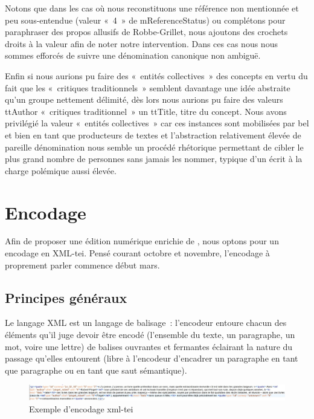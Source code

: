 \documentclass[12pt, a4paper]{article}
\begin{document}
Notons que dans les cas où nous reconstituons une référence non mentionnée et peu sous-entendue (valeur «~4~» de mReferenceStatus) ou complétons pour paraphraser des propos allusifs de Robbe-Grillet, nous ajoutons des crochets droits à la valeur afin de noter notre intervention. Dans ces cas nous nous sommes efforcés de suivre une dénomination canonique non ambiguë.

Enfin si nous aurions pu faire des «~entités collectives~» des concepts en vertu du fait que les «~critiques traditionnels~» semblent davantage une idée abstraite qu'un groupe nettement délimité, dès lors nous aurions pu faire des valeurs ttAuthor «~critiques traditionnel~» un ttTitle, titre du concept. Nous avons privilégié la valeur «~entités collectives~» car ces instances sont mobilisées par \robbe{} bel et bien en tant que producteurs de textes et l'abstraction relativement élevée de pareille dénomination nous semble un procédé rhétorique permettant de cibler le plus grand nombre de personnes sans jamais les nommer, typique d'un écrit à la charge polémique aussi élevée.






\section{Encodage}
Afin de proposer une édition numérique enrichie de \punr, nous optons pour un encodage en XML-tei. Pensé courant octobre et novembre, l'encodage à proprement parler commence début mars.
    \subsection{Principes généraux}
Le langage XML est un langage de balisage~: l'encodeur entoure chacun des éléments qu'il juge devoir être encodé (l'ensemble du texte, un paragraphe, un mot, voire une lettre) de balises ouvrantes et fermantes éclairant la nature du passage qu'elles entourent (libre à l'encodeur d'encadrer un paragraphe en tant que paragraphe ou en tant que saut sémantique).

\begin{figure}[H]
    \centering
    \includegraphics[scale=0.45]{img/screen_encodage.jpg}
    \caption{Exemple d'encodage xml-tei}
    \label{fig:screen_encodage}
\end{figure}
\end{document}
